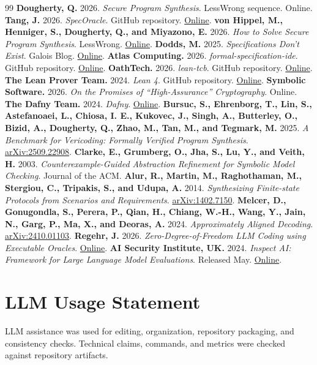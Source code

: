 \documentclass[11pt]{article}
\begin{document}
\begin{thebibliography}{99}
     \textbf{Dougherty, Q.} 2026. \textit{Secure Program Synthesis}. LessWrong sequence. Online.
     \textbf{Tang, J.} 2026. \textit{SpecOracle}. GitHub repository. \href{https://github.com/davidkimai/specoracle}{Online}.
     \textbf{von Hippel, M., Henniger, S., Dougherty, Q., and Miyazono, E.} 2026. \textit{How to Solve Secure Program Synthesis}. LessWrong. \href{https://www.lesswrong.com/posts/8wtrLoDPyCfMLuHkt/how-to-solve-secure-program-synthesis}{Online}.
     \textbf{Dodds, M.} 2025. \textit{Specifications Don't Exist}. Galois Blog. \href{https://www.galois.com/articles/specifications-dont-exist}{Online}.
     \textbf{Atlas Computing.} 2026. \textit{formal-specification-ide}. GitHub repository. \href{https://github.com/atlas-computing-org/formal-specification-ide}{Online}.
     \textbf{OathTech.} 2026. \textit{lean-tcb}. GitHub repository. \href{https://github.com/OathTech/lean-tcb}{Online}.
     \textbf{The Lean Prover Team.} 2024. \textit{Lean 4}. GitHub repository. \href{https://github.com/leanprover/lean4}{Online}.
     \textbf{Symbolic Software.} 2026. \textit{On the Promises of ``High-Assurance'' Cryptography}. Online.
     \textbf{The Dafny Team.} 2024. \textit{Dafny}. \href{https://dafny.org/}{Online}.
     \textbf{Bursuc, S., Ehrenborg, T., Lin, S., Astefanoaei, L., Chiosa, I. E., Kukovec, J., Singh, A., Butterley, O., Bizid, A., Dougherty, Q., Zhao, M., Tan, M., and Tegmark, M.} 2025. \textit{A Benchmark for Vericoding: Formally Verified Program Synthesis}. \href{https://arxiv.org/abs/2509.22908}{arXiv:2509.22908}.
     \textbf{Clarke, E., Grumberg, O., Jha, S., Lu, Y., and Veith, H.} 2003. \textit{Counterexample-Guided Abstraction Refinement for Symbolic Model Checking}. Journal of the ACM.
     \textbf{Alur, R., Martin, M., Raghothaman, M., Stergiou, C., Tripakis, S., and Udupa, A.} 2014. \textit{Synthesizing Finite-state Protocols from Scenarios and Requirements}. \href{https://arxiv.org/abs/1402.7150}{arXiv:1402.7150}.
     \textbf{Melcer, D., Gonugondla, S., Perera, P., Qian, H., Chiang, W.-H., Wang, Y., Jain, N., Garg, P., Ma, X., and Deoras, A.} 2024. \textit{Approximately Aligned Decoding}. \href{https://arxiv.org/abs/2410.01103}{arXiv:2410.01103}.
     \textbf{Regehr, J.} 2026. \textit{Zero-Degree-of-Freedom LLM Coding using Executable Oracles}. \href{https://john.regehr.org/writing/zero_dof_programming.html}{Online}.
     \textbf{AI Security Institute, UK.} 2024. \textit{Inspect AI: Framework for Large Language Model Evaluations}. Released May. \href{https://github.com/UKGovernmentBEIS/inspect_ai}{Online}.
\end{thebibliography}

\section*{LLM Usage Statement}

LLM assistance was used for editing, organization, repository packaging, and
consistency checks. Technical claims, commands, and metrics were checked
against repository artifacts.
\end{document}
